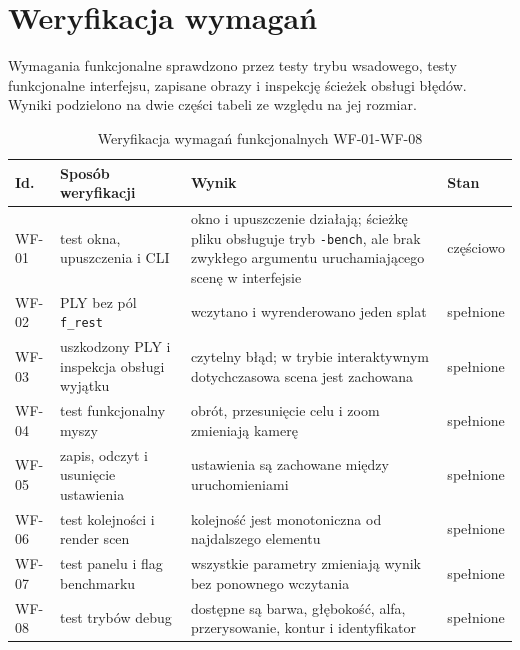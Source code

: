 \section{Weryfikacja wymagań}
\label{sec:weryfikacja_wymagan}

Wymagania funkcjonalne sprawdzono przez testy trybu wsadowego, testy funkcjonalne interfejsu, zapisane obrazy i inspekcję ścieżek obsługi błędów. Wyniki podzielono na dwie części tabeli ze względu na jej rozmiar.

\begin{table}[htbp]
  \centering
  \caption{Weryfikacja wymagań funkcjonalnych WF-01-WF-08}
  \label{tab:weryfikacja_wf_a}
  \scriptsize
  \renewcommand{\arraystretch}{1.12}
  \begin{tabularx}{\textwidth}{
      >{\raggedright\arraybackslash}p{}
      >{\raggedright\arraybackslash}p{}
      >{\raggedright\arraybackslash}X
      >{\raggedright\arraybackslash}p{}}
    \toprule
    \textbf{Id.} & \textbf{Sposób weryfikacji} & \textbf{Wynik} & \textbf{Stan} \\
    \midrule
    WF-01 & test okna, upuszczenia i CLI & okno i upuszczenie działają;
    ścieżkę pliku obsługuje tryb \texttt{-bench}, ale brak zwykłego argumentu
    uruchamiającego scenę w interfejsie & częściowo \\
    WF-02 & PLY bez pól \texttt{f\_rest} & wczytano i wyrenderowano jeden splat & spełnione \\
    WF-03 & uszkodzony PLY i inspekcja obsługi wyjątku & czytelny błąd;
    w trybie interaktywnym dotychczasowa scena jest zachowana & spełnione \\
    WF-04 & test funkcjonalny myszy & obrót, przesunięcie celu i zoom zmieniają kamerę & spełnione \\
    WF-05 & zapis, odczyt i usunięcie ustawienia & ustawienia są zachowane między uruchomieniami & spełnione \\
    WF-06 & test kolejności i render scen & kolejność jest monotoniczna od najdalszego elementu & spełnione \\
    WF-07 & test panelu i flag benchmarku & wszystkie parametry zmieniają wynik bez ponownego wczytania & spełnione \\
    WF-08 & test trybów debug & dostępne są barwa, głębokość, alfa,
    przerysowanie, kontur i identyfikator & spełnione \\
    \bottomrule
  \end{tabularx}
\end{table}

